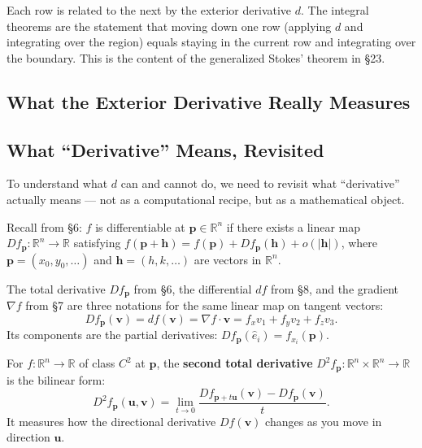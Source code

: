 \documentclass[11pt]{report}
\newcommand{\R}{\mathbb{R}}
\begin{document}
Each row is related to the next by the exterior derivative $d$. The integral theorems are the statement that moving down one row (applying $d$ and integrating over the region) equals staying in the current row and integrating over the boundary. This is the content of the generalized Stokes' theorem in \S23.

\subsection{What the Exterior Derivative Really Measures}

\subsection*{What ``Derivative'' Means, Revisited}

To understand what $d$ can and cannot do, we need to revisit what ``derivative'' actually means --- not as a computational recipe, but as a mathematical object.

Recall from \S6: $f$ is differentiable at $\mathbf{p} \in \R^n$ if there exists a linear map $Df_{\mathbf{p}}: \R^n \to \R$ satisfying $f(\mathbf{p} + \mathbf{h}) = f(\mathbf{p}) + Df_{\mathbf{p}}(\mathbf{h}) + o(|\mathbf{h}|)$, where $\mathbf{p} = (x_0, y_0, \ldots)$ and $\mathbf{h} = (h, k, \ldots)$ are vectors in $\R^n$.

\begin{proposition}[Gradient = Differential = 1-Form]
The total derivative $Df_{\mathbf{p}}$ from \S6, the differential $df$ from \S8, and the gradient $\nabla f$ from \S7 are three notations for the same linear map on tangent vectors:
\[
Df_{\mathbf{p}}(\mathbf{v}) = df(\mathbf{v}) = \nabla f \cdot \mathbf{v} = f_x v_1 + f_y v_2 + f_z v_3.
\]
Its components are the partial derivatives: $Df_{\mathbf{p}}(\hat{e}_i) = f_{x_i}(\mathbf{p})$.
\end{proposition}

\begin{definition}
For $f: \R^n \to \R$ of class $C^2$ at $\mathbf{p}$, the \textbf{second total derivative} $D^2f_{\mathbf{p}}: \R^n \times \R^n \to \R$ is the bilinear form:
\[
D^2f_{\mathbf{p}}(\mathbf{u}, \mathbf{v}) = \lim_{t \to 0} \frac{Df_{\mathbf{p}+t\mathbf{u}}(\mathbf{v}) - Df_{\mathbf{p}}(\mathbf{v})}{t}.
\]
It measures how the directional derivative $Df(\mathbf{v})$ changes as you move in direction $\mathbf{u}$.
\end{definition}
\end{document}
